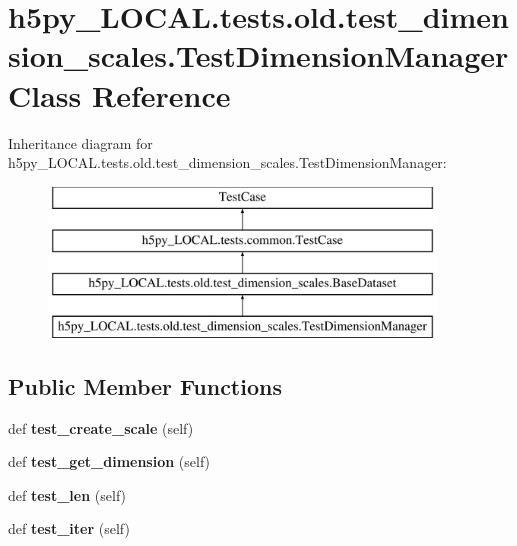 \hypertarget{classh5py__LOCAL_1_1tests_1_1old_1_1test__dimension__scales_1_1TestDimensionManager}{}\section{h5py\+\_\+\+L\+O\+C\+A\+L.\+tests.\+old.\+test\+\_\+dimension\+\_\+scales.\+Test\+Dimension\+Manager Class Reference}
\label{classh5py__LOCAL_1_1tests_1_1old_1_1test__dimension__scales_1_1TestDimensionManager}
Inheritance diagram for h5py\+\_\+\+L\+O\+C\+A\+L.\+tests.\+old.\+test\+\_\+dimension\+\_\+scales.\+Test\+Dimension\+Manager\+:\begin{figure}[H]
\begin{center}
\leavevmode
\includegraphics[height=4.000000cm]{classh5py__LOCAL_1_1tests_1_1old_1_1test__dimension__scales_1_1TestDimensionManager}
\end{center}
\end{figure}
\subsection*{Public Member Functions}
\begin{DoxyCompactItemize}
\item 
\mbox{\label{classh5py__LOCAL_1_1tests_1_1old_1_1test__dimension__scales_1_1TestDimensionManager_a401937f181e49944f6274803ec3c7699}} 
def {\bfseries test\+\_\+create\+\_\+scale} (self)
\item 
\mbox{\label{classh5py__LOCAL_1_1tests_1_1old_1_1test__dimension__scales_1_1TestDimensionManager_aba1479a5cb2271e3378c52e3574ff61b}} 
def {\bfseries test\+\_\+get\+\_\+dimension} (self)
\item 
\mbox{\label{classh5py__LOCAL_1_1tests_1_1old_1_1test__dimension__scales_1_1TestDimensionManager_ab828174926a7f148554d23f7b051f12f}} 
def {\bfseries test\+\_\+len} (self)
\item 
\mbox{\label{classh5py__LOCAL_1_1tests_1_1old_1_1test__dimension__scales_1_1TestDimensionManager_a3122c1f4532531179df40521e2116b8a}} 
def {\bfseries test\+\_\+iter} (self)
\end{DoxyCompactItemize}
